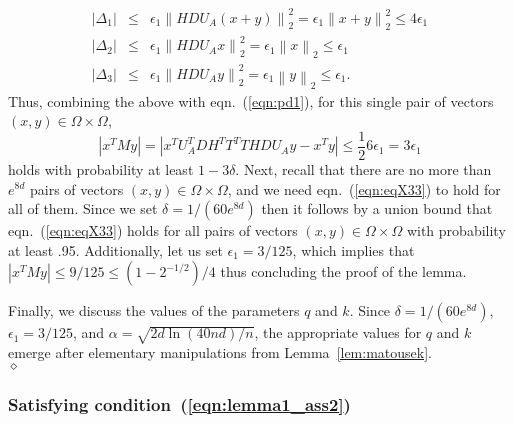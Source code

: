\documentclass[11pt]{article}
\newcommand{\VTTNorm }[1]{\mbox{}\left\|#1\right\|_2  }
\newcommand{\VTTNormS}[1]{\mbox{}\left\|#1\right\|_2^2}
\newcommand{\abs }[1]{\left|#1\right|}
\newenvironment{Proof}{\noindent {\em Proof:}}{\\\hspace*{\fill}\mbox{$\diamond$}}
\begin{document}
\begin{Proof}
\begin{eqnarray*}
\abs{\Delta_1} &\le& \epsilon_1 \VTTNormS{HDU_A(x+y)} = \epsilon_1 \VTTNormS{x+y}\leq 4\epsilon_1  \\
\abs{\Delta_2} &\le& \epsilon_1 \VTTNormS{HDU_Ax} = \epsilon_1\VTTNorm{x}    \le  \epsilon_1  \\
\abs{\Delta_3} &\le& \epsilon_1 \VTTNormS{HDU_Ay}  = \epsilon_1\VTTNorm{y}   \le  \epsilon_1  .
\end{eqnarray*}
Thus, combining the above with eqn.~(\ref{eqn:pd1}), for this single pair of vectors $(x,y) \in \Omega \times \Omega$,
\begin{equation}\label{eqn:eqX33}
\abs{x^TMy} =   \abs{x^TU_A^TDH^TT^T THDU_Ay-x^Ty} \le \frac{1}{2}6\epsilon_1 = 3 \epsilon_1
\end{equation}
holds with probability at least $1-3\delta$. Next, recall that there are no more than $e^{8d}$ pairs of vectors $(x,y)\in\Omega\times\Omega$, and we need eqn.~(\ref{eqn:eqX33}) to hold for all of them. Since we set $\delta=1/(60e^{8d})$ then it follows by a union bound that eqn.~(\ref{eqn:eqX33}) holds for all pairs of vectors $(x,y)\in\Omega\times\Omega$ with probability at least .95. Additionally, let us set $\epsilon_1=3/125$, which implies that $\abs{x^TMy}\leq 9/125 \leq \left(1-2^{-1/2}\right)/4$ thus concluding the proof of the lemma.

Finally, we discuss the values of the parameters $q$ and $k$. Since $\delta = 1/(60e^{8d})$, $\epsilon_1 = 3/125$, and $\alpha = \sqrt{2d \ln(40nd)/n}$, the appropriate values for $q$ and $k$ emerge after elementary manipulations from Lemma~\ref{lem:matousek}.
\end{Proof}

\subsubsection{Satisfying condition~(\ref{eqn:lemma1_ass2})}
\end{document}
